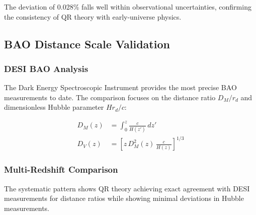 The deviation of 0.028\% falls well within observational uncertainties, confirming the consistency of QR theory with early-universe physics.

\subsection{BAO Distance Scale Validation}
\label{subsec:bao-distance-validation}

\subsubsection{DESI BAO Analysis}
\label{subsubsec:desi-analysis}

The Dark Energy Spectroscopic Instrument provides the most precise BAO measurements to date. The comparison focuses on the distance ratio $D_M/r_d$ and dimensionless Hubble parameter $H r_d / c$:

\begin{align}
D_M(z) &= \int_0^z \frac{c}{H(z')} \, dz' \\
D_V(z) &= \left[z \, D_M^2(z) \, \frac{c}{H(z)}\right]^{1/3}
\end{align}

\subsubsection{Multi-Redshift Comparison}
\label{subsubsec:multi-redshift}


The systematic pattern shows QR theory achieving exact agreement with DESI measurements for distance ratios while showing minimal deviations in Hubble measurements.